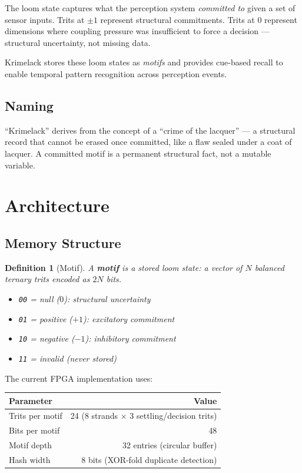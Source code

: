 \documentclass[11pt, a4paper]{article}
\newtheorem{definition}{Definition}[section]
\begin{document}
The loom state captures what the perception system
\textit{committed to} given a set of sensor inputs. Trits
at $\pm 1$ represent structural commitments. Trits at $0$
represent dimensions where coupling pressure was insufficient
to force a decision --- structural uncertainty, not missing
data.

Krimelack stores these loom states as \textit{motifs} and
provides cue-based recall to enable temporal pattern recognition
across perception events.

\subsection{Naming}

``Krimelack'' derives from the concept of a ``crime of the
lacquer'' --- a structural record that cannot be erased once
committed, like a flaw sealed under a coat of lacquer. A
committed motif is a permanent structural fact, not a mutable
variable.

\section{Architecture}

\subsection{Memory Structure}

\begin{definition}[Motif]
A \textbf{motif} is a stored loom state: a vector of $N$
balanced ternary trits encoded as $2N$ bits.
\begin{itemize}[nosep]
  \item \texttt{00} = null ($0$): structural uncertainty
  \item \texttt{01} = positive ($+1$): excitatory commitment
  \item \texttt{10} = negative ($-1$): inhibitory commitment
  \item \texttt{11} = invalid (never stored)
\end{itemize}
\end{definition}

The current FPGA implementation uses:
\begin{center}
\begin{tabular}{@{}lr@{}}
\toprule
\textbf{Parameter} & \textbf{Value} \\
\midrule
Trits per motif & 24 (8 strands $\times$ 3 settling/decision trits) \\
Bits per motif & 48 \\
Motif depth & 32 entries (circular buffer) \\
Hash width & 8 bits (XOR-fold duplicate detection) \\
\bottomrule
\end{tabular}
\end{center}
\end{document}
